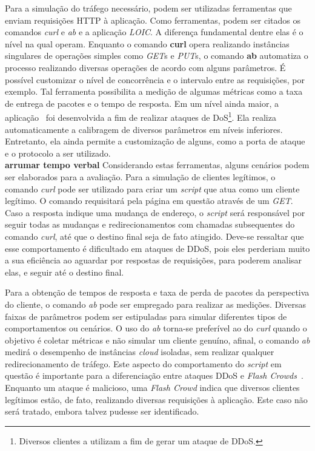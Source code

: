 
Para a simulação do tráfego necessário, podem ser utilizadas ferramentas que enviam requisições HTTP à aplicação. Como ferramentas, podem ser citados os comandos \emph{curl} e \emph{ab} e a aplicação \emph{LOIC}. A diferença fundamental dentre elas é o nível na qual operam. Enquanto o comando \textbf{curl} opera realizando instâncias singulares de operações simples como \emph{GET}s e \emph{PUT}s, o comando \textbf{ab} automatiza o processo realizando diversas operações de acordo com alguns parâmetros. É possível customizar o nível de concorrência e o intervalo entre as requisições, por exemplo. Tal ferramenta possibilita a medição de algumas métricas como a taxa de entrega de pacotes e o tempo de resposta. Em um nível ainda maior, a aplicação~\cite{loic} foi desenvolvida a fim de realizar ataques de DoS\footnote{Diversos clientes a utilizam a fim de gerar um ataque de DDoS.}. Ela realiza automaticamente a calibragem de diversos parâmetros em níveis inferiores. Entretanto, ela ainda permite a customização de alguns, como a porta de ataque e o protocolo a ser utilizado.\\
\textbf{arrumar tempo verbal}
Considerando estas ferramentas, alguns cenários podem ser elaborados para a avaliação. 
%
Para a simulação de clientes legítimos, o comando \emph{curl} pode ser utilizado para criar um \emph{script} que atua como um cliente legítimo. O comando requisitará pela página em questão através de um \emph{GET}. Caso a resposta indique uma mudança de endereço, o \emph{script} será responsável por seguir todas as mudanças e redirecionamentos com chamadas subsequentes do comando \emph{curl}, até que o destino final seja de fato atingido. Deve-se ressaltar que esse comportamento é dificultado em ataques de DDoS, pois eles perderiam muito a sua eficiência ao aguardar por respostas de requisições, para poderem analisar elas, e seguir até o destino final.

Para a obtenção de tempos de resposta e taxa de perda de pacotes da perspectiva do cliente, o comando \emph{ab} pode ser empregado para realizar as medições. Diversas faixas de parâmetros podem ser estipuladas para simular diferentes tipos de comportamentos ou cenários. O uso do \emph{ab} torna-se preferível ao do \emph{curl} quando o objetivo é coletar métricas e não simular um cliente genuíno, afinal, o comando \emph{ab} medirá o desempenho de instâncias \emph{cloud} isoladas, sem realizar qualquer redirecionamento de tráfego. Este aspecto do comportamento do \emph{script} em questão é importante para a diferenciação entre ataques DDoS e \emph{Flash Crowds}~\cite{Thapngam:2011p27061}. Enquanto um ataque é malicioso, uma \emph{Flash Crowd} indica que diversos clientes legítimos estão, de fato, realizando diversas requisições à aplicação. Este caso não será tratado, embora talvez pudesse ser identificado.

